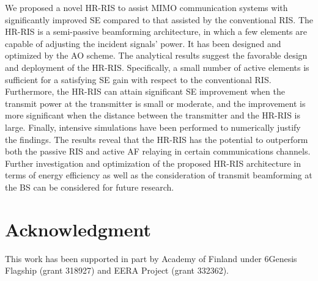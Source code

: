 \documentclass[conference]{IEEEtran}
\begin{document}
	We proposed a novel HR-RIS to assist MIMO communication systems with significantly improved SE compared to that assisted by the conventional RIS. The HR-RIS is a semi-passive beamforming architecture, in which a few elements are capable of adjusting the incident signals' power. It has been designed and optimized by the AO scheme. The analytical results suggest the favorable design and deployment of the HR-RIS. Specifically, a small number of active elements is sufficient for a satisfying SE gain with respect to the conventional RIS. Furthermore, the HR-RIS can attain significant SE improvement when the transmit power at the transmitter is small or moderate, and the improvement is more significant when the distance between the transmitter and the HR-RIS is large. Finally, intensive simulations have been performed to numerically justify the findings. The results reveal that the HR-RIS has the potential to outperform both the passive RIS and active AF relaying in certain communications channels. Further investigation and optimization of the proposed HR-RIS architecture in terms of energy efficiency as well as the consideration of transmit beamforming at the BS can be considered for future research.
	
	\section*{Acknowledgment}
    This work has been supported in part by Academy of Finland under 6Genesis Flagship (grant 318927) and EERA Project (grant 332362).

	
	
	
	
	
\end{document}
